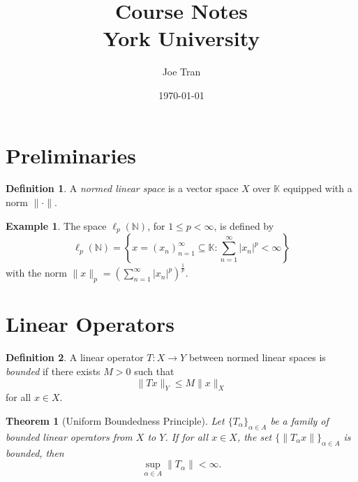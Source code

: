 \documentclass[11pt]{article}
\title{\textbf{Course Notes} \\[0.5em] \large York University}
\author{Joe Tran}
\date{\today}
\newtheorem{theorem}{Theorem}[section]
\theoremstyle{definition}
\newtheorem*{definition}{Definition}
\newtheorem*{example}{Example}
\newcommand{\K}{\mathbb{K}}
\newcommand{\N}{\mathbb{N}}
\begin{document}
\maketitle

\tableofcontents

\newpage

\section{Preliminaries}

\begin{definition}
    A \textit{normed linear space} is a vector space $X$ over $\K$ equipped with a norm $\|\cdot\|$.
\end{definition}

\begin{example}
    The space $\ell_p(\N)$, for $1 \leq p < \infty$, is defined by
    \begin{equation*}
        \ell_p(\N) = \left\{x = (x_n)_{n = 1}^{\infty} \subseteq \K : \sum_{n = 1}^{\infty} |x_n|^p < \infty\right\}
    \end{equation*}
    with the norm $\|x\|_p = \left(\sum_{n = 1}^{\infty} |x_n|^p\right)^{\frac{1}{p}}$.
\end{example}

\section{Linear Operators}

\begin{definition}
    A linear operator $T : X \to Y$ between normed linear spaces is \textit{bounded} if there exists $M > 0$ such that
    \begin{equation*}
        \|Tx\|_Y \leq M\|x\|_X
    \end{equation*}
    for all $x \in X$.
\end{definition}

\begin{theorem}[Uniform Boundedness Principle]
    Let $\{T_{\alpha}\}_{\alpha \in A}$ be a family of bounded linear operators from $X$ to $Y$. If for all $x \in X$, the set $\{\|T_{\alpha}x\|\}_{\alpha \in A}$ is bounded, then
    \begin{equation*}
        \sup_{\alpha \in A} \|T_{\alpha}\| < \infty.
    \end{equation*}
\end{theorem}
    
\end{document}
